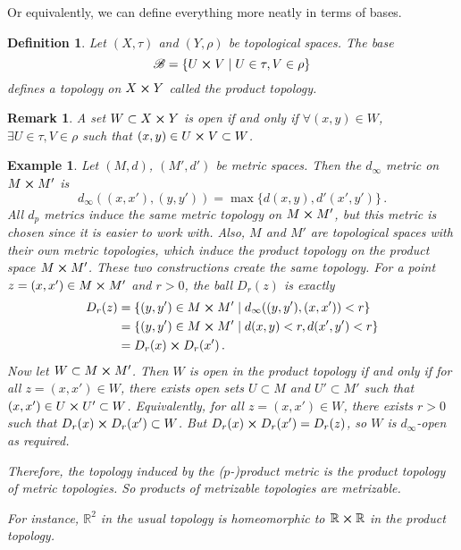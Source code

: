 \documentclass{article}
\theoremstyle{plain}\theoremheaderfont{\normalfont\itshape}\theorembodyfont{\rmfamily}\theoremseparator{.}\newtheorem*{rem}{Remark}\newtheorem*{ex}{Example}\newtheorem*{proof}{Proof}\newtheorem*{altp}{Alternative proof}
\theoremstyle{plain}\theoremheaderfont{\normalfont\bfseries}\theorembodyfont{\rmfamily}\theoremseparator{.}\newtheorem{thm}{Theorem}[section]\newtheorem{lem}[thm]{Lemma}\newtheorem{prop}[thm]{Proposition}\newtheorem*{cor}{Corollary}\newtheorem{defn}[thm]{Definition}\newtheorem{clm}[thm]{Claim}\newtheorem{clminproof}{Claim}
\theoremstyle{break}\theoremheaderfont{\normalfont\itshape}\theorembodyfont{\rmfamily}\theoremseparator{.\medskip}\newtheorem*{proofskip}{Proof}\newtheorem*{exs}{Examples}\newtheorem*{rems}{Remarks}
\theoremstyle{break}\theoremheaderfont{\normalfont\bfseries}\theorembodyfont{\rmfamily}\theoremseparator{.\medskip}\newtheorem{lemskip}[thm]{Lemma}\newtheorem{defnskip}[thm]{Definition}\newtheorem{propskip}[thm]{Proposition}\newtheorem{thmskip}[thm]{Theorem}
\begin{document}
    Or equivalently, we can define everything more neatly in terms of bases.

    \begin{defn}
        Let \((X,\tau)\) and \((Y,\rho)\) be topological spaces. The base
        \[\mathscr{B}=\{U\cross V\mid U\in\tau,V\in\rho\}\]
        defines a topology on \(X\cross Y\) called the \textit{product topology}.
    \end{defn}
    \begin{rem}
        A set \(W\subset X\cross Y\) is open if and only if \(\forall (x,y)\in W\), \(\exists U\in\tau,V\in\rho\) such that \((x,y)\in U\cross V\subset W\).
    \end{rem}
    \begin{ex}
        Let \((M,d)\), \((M',d')\) be metric spaces. Then the \(d_\infty\) metric on \(M\cross M'\) is
        \[d_\infty((x,x'),(y,y'))=\max\{d(x,y),d'(x',y')\}\,.\]
        All \(d_p\) metrics induce the same metric topology on \(M\cross M'\), but this metric is chosen since it is easier to work with. Also, \(M\) and \(M'\) are topological spaces with their own metric topologies, which induce the product topology on the product space \(M\cross M'\). These two constructions create the same topology. For a point \(z=(x,x')\in M\cross M'\) and \(r>0\), the ball \(D_r(z)\) is exactly
        \begin{align*}
            D_r(z)&=\{(y,y')\in M\cross M'\mid d_\infty((y,y'),(x,x'))<r\}\\
            &=\{(y,y')\in M\cross M'\mid d(x,y)<r,d(x',y')<r\}\\
            &=D_r(x)\cross D_r(x')\,.
        \end{align*}
        Now let \(W\subset M\cross M'\). Then \(W\) is open in the product topology if and only if for all \(z=(x,x')\in W\), there exists open sets \(U\subset M\) and \(U'\subset M'\) such that \((x,x')\in U\cross U'\subset W\). Equivalently, for all \(z=(x,x')\in W\), there exists \(r>0\) such that \(D_r(x)\cross D_r(x')\subset W\). But \(D_r(x)\cross D_r(x')=D_r(z)\), so \(W\) is \(d_\infty\)-open as required.

        Therefore, the topology induced by the (\(p\)-)product metric is the product topology of metric topologies. So products of metrizable topologies are metrizable.

        For instance, \(\mathbb{R}^2\) in the usual topology is homeomorphic to \(\mathbb{R}\cross\mathbb{R}\) in the product topology.
    \end{ex}
\end{document}
